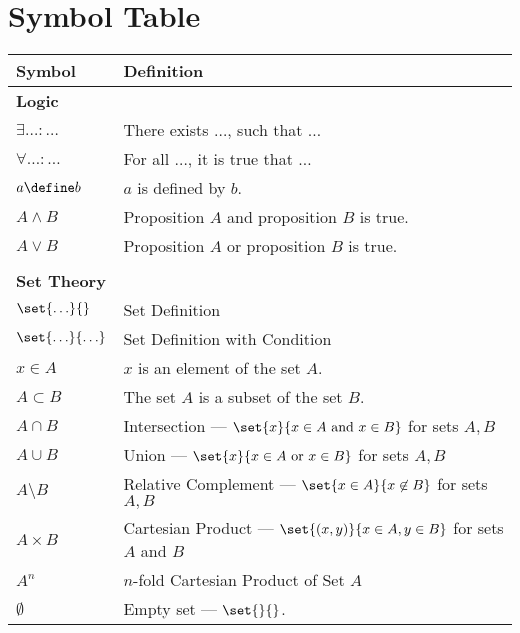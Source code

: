 \documentclass[crop=false,10pt,ngerman]{standalone}
\begin{document}
  \section*{Symbol Table}

  \bigskip

  \renewcommand{\arraystretch}{1.3}
  {
    \scriptsize
    \begin{tabularx}{\textwidth}{p{}p{}}
      \hline
      \textbf{Symbol} & \textbf{Definition} \\
      \hline
      \hline

      \textbf{Logic} & \\
      $\exists \ldots : \ldots$ & There exists $\ldots$, such that $\ldots$ \\
      $\forall \ldots : \ldots$ & For all $\ldots$, it is true that $\ldots$ \\
      $a\define b$ & $a$ is defined by $b$. \\
      $A \wedge B$ & Proposition $A$ and proposition $B$ is true. \\
      $A \vee B$ & Proposition $A$ or proposition $B$ is true. \\

      \\
      \hline

      \textbf{Set Theory} & \\
      $\set{\ldots}{}$ & Set Definition \\
      $\set{\ldots}{\ldots}$ & Set Definition with Condition \\
      $x\in A$ & $x$ is an element of the set $A$. \\
      $A\subset B$ & The set $A$ is a subset of the set $B$. \\
      $A\cap B$ & Intersection --- $\set{x}{x\in A \text{ and } x\in B}$ for sets $A,B$ \\
      $A\cup B$ & Union --- $\set{x}{x\in A \text{ or } x\in B}$ for sets $A,B$ \\
      $A\setminus B$ & Relative Complement --- $\set{x\in A}{x\not\in B}$ for sets $A,B$ \\
      $A\times B$ & Cartesian Product --- $\set{(x,y)}{x\in A,y\in B}$ for sets $A$ and $B$ \\
      $A^n$ & $n$-fold Cartesian Product of Set $A$ \\
      $\emptyset$ & Empty set --- $\set{}{}$. \\


\end{tabularx}}
\end{document}
